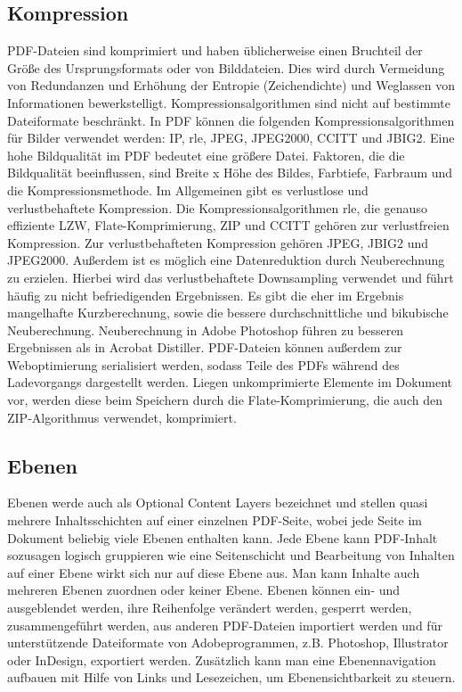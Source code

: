 \subsection{Kompression}
PDF-Dateien sind komprimiert und haben üblicherweise einen Bruchteil der Größe des Ursprungsformats oder von Bilddateien. Dies wird durch Vermeidung von Redundanzen und Erhöhung der Entropie (Zeichendichte) und Weglassen von Informationen bewerkstelligt. Kompressionsalgorithmen sind nicht auf bestimmte Dateiformate beschränkt. \cite{schneeberger} In PDF können die folgenden Kompressionsalgorithmen für Bilder verwendet werden: IP, \gls{rle}, JPEG, JPEG2000, CCITT und JBIG2. Eine hohe Bildqualität im PDF bedeutet eine größere Datei. Faktoren, die die Bildqualität beeinflussen, sind Breite x Höhe des Bildes, Farbtiefe, Farbraum und die Kompressionsmethode. \cite{softx} Im Allgemeinen gibt es verlustlose und verlustbehaftete Kompression. Die Kompressionsalgorithmen \gls{rle}, die genauso effiziente LZW, Flate-Komprimierung, ZIP und CCITT gehören zur verlustfreien Kompression. Zur verlustbehafteten Kompression gehören JPEG, JBIG2 und JPEG2000. Außerdem ist es möglich eine Datenreduktion durch Neuberechnung zu erzielen. Hierbei wird das verlustbehaftete Downsampling verwendet und führt häufig zu nicht befriedigenden Ergebnissen. Es gibt die eher im Ergebnis mangelhafte Kurzberechnung, sowie die bessere durchschnittliche und bikubische Neuberechnung. Neuberechnung in Adobe Photoshop führen zu besseren Ergebnissen als in Acrobat Distiller. \cite{schneeberger}
PDF-Dateien können außerdem zur Weboptimierung serialisiert werden, sodass Teile des PDFs während des Ladevorgangs dargestellt werden. Liegen unkomprimierte Elemente im Dokument vor, werden diese beim Speichern durch die Flate-Komprimierung, die auch den ZIP-Algorithmus verwendet, komprimiert.

\subsection{Ebenen}
Ebenen werde auch als Optional Content Layers bezeichnet und stellen quasi mehrere Inhaltsschichten auf einer einzelnen PDF-Seite, wobei jede Seite im Dokument beliebig viele Ebenen enthalten kann. Jede Ebene kann PDF-Inhalt sozusagen logisch gruppieren wie eine Seitenschicht und Bearbeitung von Inhalten auf einer Ebene wirkt sich nur auf diese Ebene aus. Man kann Inhalte auch mehreren Ebenen zuordnen oder keiner Ebene. Ebenen können ein- und ausgeblendet werden, ihre Reihenfolge verändert werden, gesperrt werden, zusammengeführt werden, aus anderen PDF-Dateien importiert werden und für unterstützende Dateiformate von Adobeprogrammen, z.B. Photoshop, Illustrator oder InDesign, exportiert werden. Zusätzlich kann man eine Ebenennavigation aufbauen mit Hilfe von Links und Lesezeichen, um Ebenensichtbarkeit zu steuern. \cite{adobe-ebenen}

